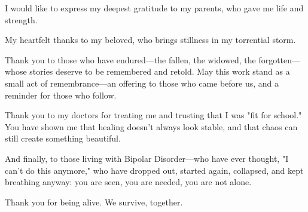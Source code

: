 \documentclass[../1_thesis]{subfiles}
\begin{document}

\begin{acknowledgementslong}
I would like to express my deepest gratitude to my parents, who gave me life and strength.

My heartfelt thanks to my beloved, who brings stillness in my torrential storm.

Thank you to those who have endured—the fallen, the widowed, the forgotten---whose stories deserve to be remembered and retold.  
May this work stand as a small act of remembrance—an offering to those who came before us, and a reminder for those who follow.

Thank you to my doctors for treating me and trusting that I was "fit for school." 
You have shown me that healing doesn't always look stable, and that chaos can still create something beautiful.

And finally, to those living with Bipolar Disorder—who have ever thought, "I can't do this anymore," 
who have dropped out, started again, collapsed, and kept breathing anyway:  
you are seen, you are needed, you are not alone.  

Thank you for being alive.
We survive, together.

\end{acknowledgementslong}
\end{document}
